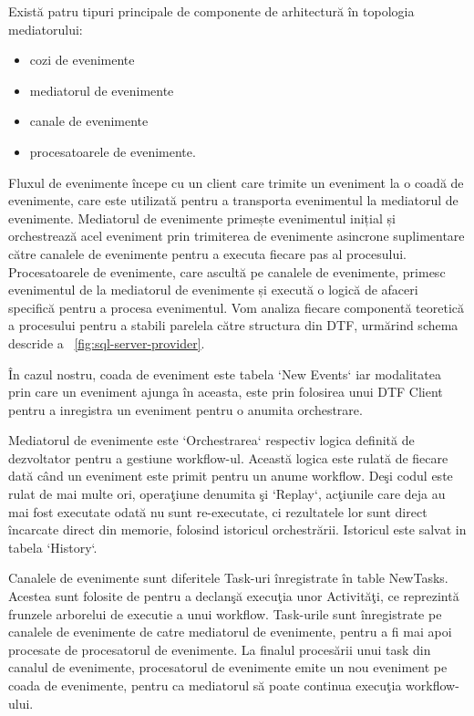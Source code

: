 \par Există patru tipuri principale de componente de arhitectură în topologia mediatorului: 
\begin{itemize}
\item cozi de evenimente
\item mediatorul de evenimente
\item canale de evenimente
\item procesatoarele de evenimente. 
\end{itemize}
\par Fluxul de evenimente începe cu un client care trimite un eveniment la o coadă de evenimente, care este utilizată pentru a transporta evenimentul la mediatorul de evenimente. Mediatorul de evenimente primește evenimentul inițial și orchestrează acel eveniment prin trimiterea de evenimente asincrone suplimentare către canalele de evenimente pentru a executa fiecare pas al procesului. Procesatoarele de evenimente, care ascultă pe canalele de evenimente, primesc evenimentul de la mediatorul de evenimente și execută o logică de afaceri specifică pentru a procesa evenimentul.  Vom analiza fiecare componentă teoretică a procesului pentru a stabili parelela către structura din DTF, urmărind schema descride a ~\ref{fig:sql-server-provider}.
\par În cazul nostru, coada de eveniment este tabela `New Events` iar modalitatea prin care un eveniment ajunga în aceasta, este prin folosirea unui DTF Client pentru a inregistra un eveniment pentru o anumita orchestrare. 
\par Mediatorul de evenimente este `Orchestrarea` respectiv logica definită de dezvoltator pentru a gestiune workflow-ul. Această logica este rulată de fiecare dată când un eveniment este primit pentru un anume workflow. Deşi codul este rulat de mai multe ori, operaţiune denumita şi `Replay`, acţiunile care deja au mai fost executate odată nu sunt re-executate, ci rezultatele lor sunt direct încarcate direct din memorie, folosind istoricul orchestrării. Istoricul este salvat in tabela `History`.
\par Canalele de evenimente sunt diferitele Task-uri înregistrate în table NewTasks. Acestea sunt folosite de pentru a declanşă execuţia unor Activităţi, ce reprezintă frunzele arborelui de executie a unui workflow. Task-urile sunt înregistrate pe canalele de evenimente de catre mediatorul de evenimente, pentru a fi mai apoi procesate de procesatorul de evenimente. La finalul procesării unui task din canalul de evenimente, procesatorul de evenimente emite un nou eveniment pe coada de evenimente, pentru ca mediatorul să poate continua execuţia workflow-ului. 
